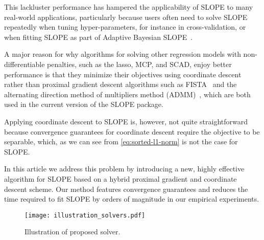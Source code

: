 This lackluster performance has hampered the applicability of SLOPE to many
real-world applications,  particularly because users often need to solve SLOPE
repeatedly when tuning hyper-parameters, for instance in
cross-validation, or when fitting SLOPE as part of Adaptive Bayesian
SLOPE~\cite{jiang2022}.

A major reason for why algorithms for solving other regression models with
non-differentiable penalties, such as the lasso, MCP, and SCAD, enjoy better
performance is that they minimize their objectives using coordinate
descent~\cite{breheny2011, friedman2010} rather than proximal gradient descent
algorithms such as FISTA~\cite{beck2009} and the
alternating direction method of multipliers method (ADMM)~\cite{boyd2010},
which are both used in the current version of the SLOPE package.

Applying coordinate descent to SLOPE is, however, not quite straightforward
because convergence guarantees for coordinate descent require the
objective to be separable, which, as we can see from \eqref{eq:sorted-l1-norm}
is not the case for SLOPE.


In this article we address this problem by introducing a new, highly effective
algorithm for SLOPE based on a hybrid proximal gradient and coordinate descent
scheme. Our method features convergence guarantees and reduces the time
required to fit SLOPE by orders of magnitude in our empirical experiments.

\begin{figure}[htbp]
  \centering
  \texttt{[image: illustration\_solvers.pdf]}
  \caption{Illustration of proposed solver.}
  \label{fig:illustration-solver}
\end{figure}
